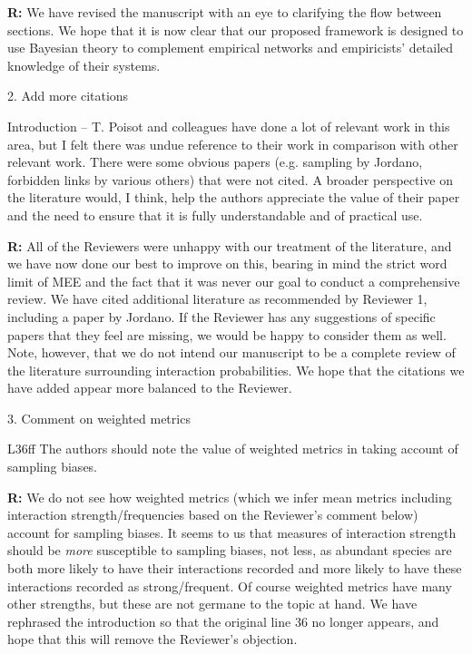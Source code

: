 \documentclass[12pt]{letter}
\newenvironment{refquote}{\bigskip \begin{it}}{\end{it}\smallskip}
\begin{document}
		\textbf{R:} We have revised the manuscript with an eye to clarifying the flow between sections. We hope that it is now clear that our proposed framework is designed to use Bayesian theory to complement empirical networks and empiricists' detailed knowledge of their systems. 


	2. Add more citations


		\begin{refquote}
		Introduction – T. Poisot and colleagues have done a lot of relevant work in this area, but I felt there was undue reference to their work in comparison with other relevant work. There were some obvious papers (e.g. sampling by Jordano, forbidden links by various others) that were not cited. A broader perspective on the literature would, I think, help the authors appreciate the value of their paper and the need to ensure that it is fully understandable and of practical use.
		\end{refquote}


		\textbf{R:} All of the Reviewers were unhappy with our treatment of the literature, and we have now done our best to improve on this, bearing in mind the strict word limit of MEE and the fact that it was never our goal to conduct a comprehensive review. We have cited additional literature as recommended by Reviewer 1, including a paper by Jordano. If the Reviewer has any suggestions of specific papers that they feel are missing, we would be happy to consider them as well. Note, however, that we do not intend our manuscript to be a complete review of the literature surrounding interaction probabilities. We hope that the citations we have added appear more balanced to the Reviewer.


	3. Comment on weighted metrics


		\begin{refquote}
		L36ff The authors should note the value of weighted metrics in taking account of sampling biases.
		\end{refquote}


		\textbf{R:} We do not see how weighted metrics (which we infer mean metrics including interaction strength/frequencies based on the Reviewer's comment below) account for sampling biases. It seems to us that measures of interaction strength should be \emph{more} susceptible to sampling biases, not less, as abundant species are both more likely to have their interactions recorded and more likely to have these interactions recorded as strong/frequent. Of course weighted metrics have many other strengths, but these are not germane to the topic at hand. We have rephrased the introduction so that the original line 36 no longer appears, and hope that this will remove the Reviewer's objection.
\end{document}
